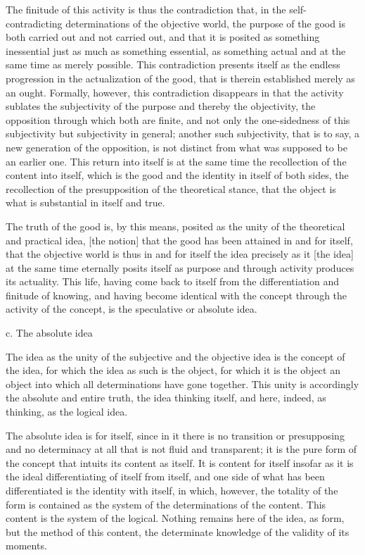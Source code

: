 The finitude of this activity is thus the contradiction that,
in the self-contradicting determinations of the objective world,
the purpose of the good is both carried out and not carried out,
and that it is posited as something inessential
just as much as something essential,
as something actual and at the same time
as merely possible.
This contradiction presents itself
as the endless progression in the actualization of the good,
that is therein established merely as an ought.
Formally, however, this contradiction disappears
in that the activity sublates the subjectivity of the purpose
and thereby the objectivity,
the opposition through which both are finite,
and not only the one-sidedness of this subjectivity
but subjectivity in general;
another such subjectivity, that is to say,
a new generation of the opposition,
is not distinct from what was supposed to be an earlier one.
This return into itself is at the same time
the recollection of the content into itself,
which is the good and the identity in itself of both sides,
the recollection of the presupposition of the theoretical stance,
that the object is what is substantial in itself and true.

The truth of the good is, by this means, posited as
the unity of the theoretical and practical idea,
[the notion] that the good has been attained in and for itself,
that the objective world is thus in and for itself the idea precisely as
it [the idea] at the same time eternally posits itself as purpose and
through activity produces its actuality.
This life, having come back to itself from
the differentiation and finitude of knowing,
and having become identical with the concept
through the activity of the concept,
is the speculative or absolute idea.

c. The absolute idea

The idea as the unity of
the subjective and the objective idea is
the concept of the idea,
for which the idea as such is the object,
for which it is the object
an object into which
all determinations have gone together.
This unity is accordingly
the absolute and entire truth,
the idea thinking itself,
and here, indeed, as thinking,
as the logical idea.

The absolute idea is for itself,
since in it there is no transition or presupposing
and no determinacy at all that is not fluid and transparent;
it is the pure form of the concept
that intuits its content as itself.
It is content for itself
insofar as it is the ideal differentiating of
itself from itself,
and one side of what has been differentiated is
the identity with itself,
in which, however, the totality of the form is
contained as the system of the determinations of the content.
This content is the system of the logical.
Nothing remains here of the idea, as form,
but the method of this content,
the determinate knowledge of the validity of its moments.

